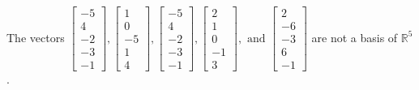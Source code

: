 \begin{exercise}
\begin{exerciseStatement}
  \end{exerciseStatement}
  \begin{exerciseAnswer}
   The vectors \(\left[\begin{array}{r}
-5 \\
4 \\
-2 \\
-3 \\
-1
\end{array}\right] , \left[\begin{array}{r}
1 \\
0 \\
-5 \\
1 \\
4
\end{array}\right] , \left[\begin{array}{r}
-5 \\
4 \\
-2 \\
-3 \\
-1
\end{array}\right] , \left[\begin{array}{r}
2 \\
1 \\
0 \\
-1 \\
3
\end{array}\right] , \text{ and } \left[\begin{array}{r}
2 \\
-6 \\
-3 \\
6 \\
-1
\end{array}\right]\) 
  	 are not  a basis of \(\mathbb{R}^5\).
  


  \end{exerciseAnswer}
\end{exercise}